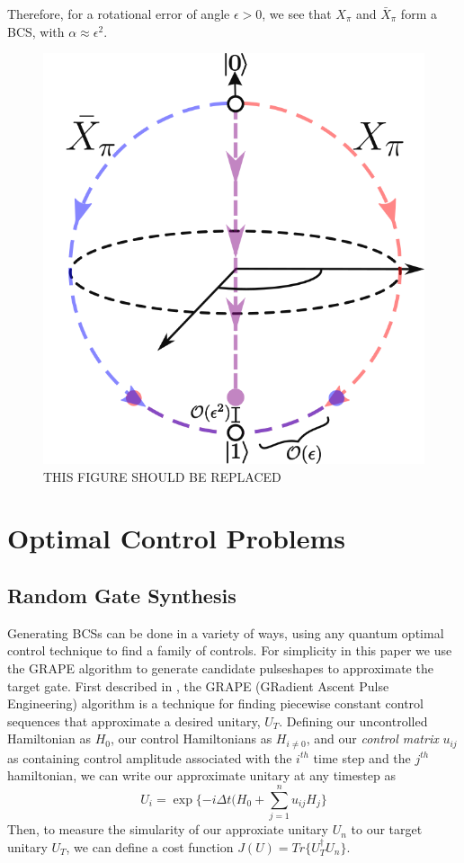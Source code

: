 \documentclass[aps,nofootinbib,pra,notitlepage,twocolumn]{revtex4-1}
\begin{document}
Therefore, for a rotational error of angle $\epsilon > 0$, we see that $X_\pi$ and  $\bar X_\pi$  form a BCS, with $\alpha\approx\epsilon^2$.


\begin{figure}
  \centering
  \includegraphics[width=.75\columnwidth]{simple_example.png}
  \caption{THIS FIGURE SHOULD BE REPLACED}
  \label{fig:simple_example}
\end{figure}
\section{Optimal Control Problems}\label{ocp}
\subsection{Random Gate Synthesis}
Generating BCSs can be done in a variety of ways, using any quantum optimal control technique \cite{Caneva2011, Machnes2018} to find a family of controls. For simplicity in this paper we use the GRAPE algorithm to generate candidate pulseshapes to approximate the target gate. First described in \cite{Khaneja2005}, the GRAPE (GRadient Ascent Pulse Engineering) algorithm is a technique for finding piecewise constant control sequences that approximate a desired unitary, $U_T$. Defining our uncontrolled Hamiltonian as $H_0$, our control Hamiltonians as $H_{i\neq 0}$, and our \textit{control matrix} $u_{ij}$ as containing control amplitude associated with the $i^{th}$ time step and the $j^{th}$ hamiltonian, we can write our approximate unitary at any timestep as
\begin{equation}\label{eq:3}
  U_i = \exp\{-i\Delta t(H_0 + \sum_{j=1}^{n}u_{ij}H_{j}\}
\end{equation}
Then, to measure the simularity of our approxiate unitary $U_n$ to our target unitary $U_T$, we can define a cost function $J(U) = Tr\{U_T^{\dagger}U_n\}$.
\end{document}
